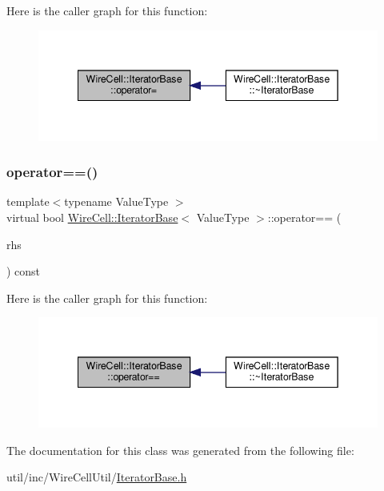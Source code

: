 Here is the caller graph for this function\+:
\nopagebreak
\begin{figure}[H]
\begin{center}
\leavevmode
\includegraphics[width=342pt]{class_wire_cell_1_1_iterator_base_ad62dd2f5a05b89ce63ad9b9e62167856_icgraph}
\end{center}
\end{figure}
\mbox{\label{class_wire_cell_1_1_iterator_base_aa2dc364b16da871fd63983ec04b58ca0}} 
\subsubsection{\texorpdfstring{operator==()}{operator==()}}
{\footnotesize\ttfamily template$<$typename Value\+Type $>$ \\
virtual bool \hyperlink{class_wire_cell_1_1_iterator_base}{Wire\+Cell\+::\+Iterator\+Base}$<$ Value\+Type $>$\+::operator== (\begin{DoxyParamCaption}\item[{const \hyperlink{class_wire_cell_1_1_iterator_base}{Iterator\+Base}$<$ Value\+Type $>$ \&}]{rhs }\end{DoxyParamCaption}) const\hspace{0.3cm}{\ttfamily [pure virtual]}}

Here is the caller graph for this function\+:
\nopagebreak
\begin{figure}[H]
\begin{center}
\leavevmode
\includegraphics[width=342pt]{class_wire_cell_1_1_iterator_base_aa2dc364b16da871fd63983ec04b58ca0_icgraph}
\end{center}
\end{figure}


The documentation for this class was generated from the following file\+:\begin{DoxyCompactItemize}
\item 
util/inc/\+Wire\+Cell\+Util/\hyperlink{_iterator_base_8h}{Iterator\+Base.\+h}\end{DoxyCompactItemize}
